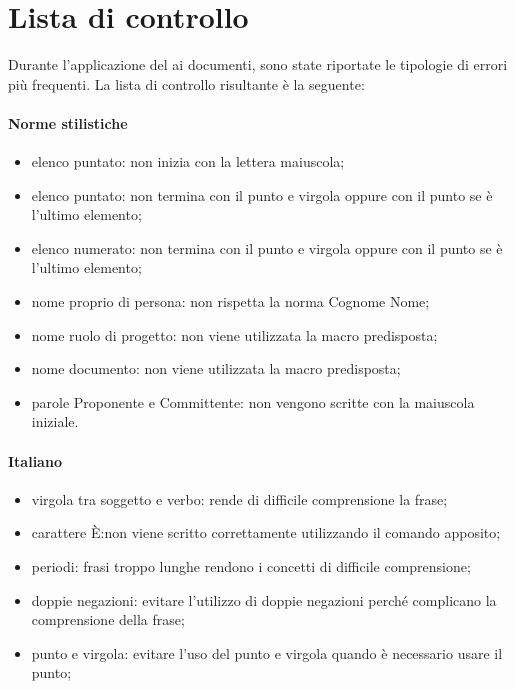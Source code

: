 \documentclass[12pt,a4paper]{article}
\begin{document}
\newpage

\appendix
\section{Lista di controllo}

Durante l’applicazione del  ai documenti, sono state riportate le tipologie di errori più frequenti. La lista di controllo risultante è la seguente:
\paragraph{Norme stilistiche}
\begin{itemize}
	\item elenco puntato: non inizia con la lettera maiuscola;
	\item elenco puntato: non termina con il punto e virgola oppure con il punto se è l’ultimo elemento; 
	\item elenco numerato: non termina con il punto e virgola oppure con il punto se è l’ultimo elemento; 
	\item nome proprio di persona: non rispetta la norma Cognome Nome;
	\item nome ruolo di progetto: non viene utilizzata la macro predisposta;
	\item nome documento: non viene utilizzata la macro predisposta;
	\item parole Proponente e Committente: non vengono scritte con la maiuscola iniziale. 
\end{itemize}

\paragraph{Italiano}
\begin{itemize}
	\item virgola tra soggetto e verbo: rende di difficile comprensione la frase;
	\item carattere È:non viene scritto correttamente utilizzando il comando apposito;
	\item periodi: frasi troppo lunghe rendono i concetti di difficile comprensione; 
	\item doppie negazioni: evitare l’utilizzo di doppie negazioni perché complicano la comprensione della frase; 
	\item punto e virgola: evitare l’uso del punto e virgola quando è necessario usare il punto; 
\end{itemize}
\end{document}
